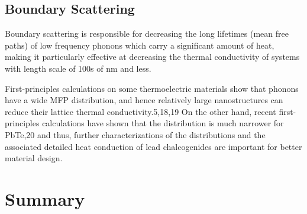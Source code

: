 \documentclass[aps,prb,twocolumn,superscriptaddress,preprintnumbers,amsmath,amssymb,floatfix]{revtex4}
\begin{document}
\subsection{\label{S:}Boundary Scattering}
Boundary scattering is responsible for decreasing the long lifetimes 
(mean free paths) of low frequency phonons which carry a significant 
amount of heat, making it particularly effective at decreasing the 
thermal conductivity of systems with length scale of 100s of nm and 
less.\cite{mcgaughey_nanostructure_2012}

First-principles calculations on some thermoelectric
materials show that phonons have a wide MFP distribution,
and hence relatively large nanostructures can reduce their
lattice thermal conductivity.5,18,19 On the other hand, recent
first-principles calculations have shown that the distribution is
much narrower for PbTe,20 and thus, further characterizations
of the distributions and the associated detailed heat conduction
of lead chalcogenides are important for better material design.
\section{\label{S:}Summary}


\appendix
\end{document}
